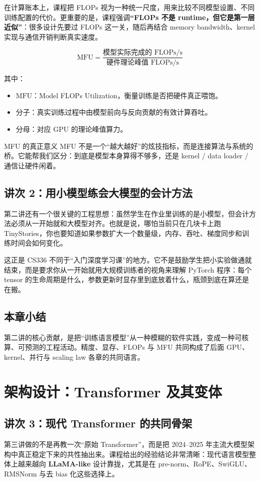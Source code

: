 \documentclass[a4paper]{article}
\begin{document}
在计算账本上，课程把 FLOPs 视为一种统一尺度，用来比较不同模型设置、不同训练配置的代价。更重要的是，课程强调\textbf{“FLOPs 不是 runtime，但它是第一层近似”}：很多设计先要过 FLOPs 这一关，随后再结合 memory bandwidth、kernel 实现与通信开销判断真实速度。

\[
\mathrm{MFU} = \frac{\text{模型实际完成的 FLOPs/s}}{\text{硬件理论峰值 FLOPs/s}}
\]

其中：
\begin{itemize}
\item $\mathrm{MFU}$：Model FLOPs Utilization，衡量训练是否把硬件真正喂饱。
\item 分子：真实训练过程中由模型前向与反向贡献的有效计算吞吐。
\item 分母：对应 GPU 的理论峰值算力。
\end{itemize}

\begin{importantbox}{MFU 的真正意义}
MFU 不是一个“越大越好”的炫技指标，而是连接算法与系统的桥。它能帮我们区分：到底是模型本身算得不够多，还是 kernel / data loader / 通信让硬件闲着。
\end{importantbox}

\subsection{讲次 2：用小模型练会大模型的会计方法}
第二讲还有一个很关键的工程思想：虽然学生在作业里训练的是小模型，但会计方法必须从一开始就和大模型对齐。也就是说，哪怕当前只在几块卡上跑 TinyStories，你也要知道如果参数扩大一个数量级，内存、吞吐、梯度同步和训练时间会如何变化。

这正是 CS336 不同于“入门深度学习课”的地方。它不是鼓励学生把小实验做通就结束，而是要求你从一开始就用大规模训练者的视角来理解 PyTorch 程序：每个 tensor 的生命周期是什么，参数更新时显存里到底放着什么，瓶颈到底在算还是在搬。

\subsection{本章小结}
第二讲的核心贡献，是把“训练语言模型”从一种模糊的软件实践，变成一种可核算、可预测的工程活动。精度、显存、FLOPs 与 MFU 共同构成了后面 GPU、kernel、并行与 scaling law 各章的共同语言。

\section{架构设计：Transformer 及其变体}

\subsection{讲次 3：现代 Transformer 的共同骨架}
第三讲做的不是再教一次“原始 Transformer”，而是把 2024--2025 年主流大模型架构中真正稳定下来的共性抽出来。课程给出的经验结论非常清晰：现代语言模型整体上越来越向 \textbf{LLaMA-like} 设计靠拢，尤其是在 pre-norm、RoPE、SwiGLU、RMSNorm 与去 bias 化这些选择上。
\end{document}
